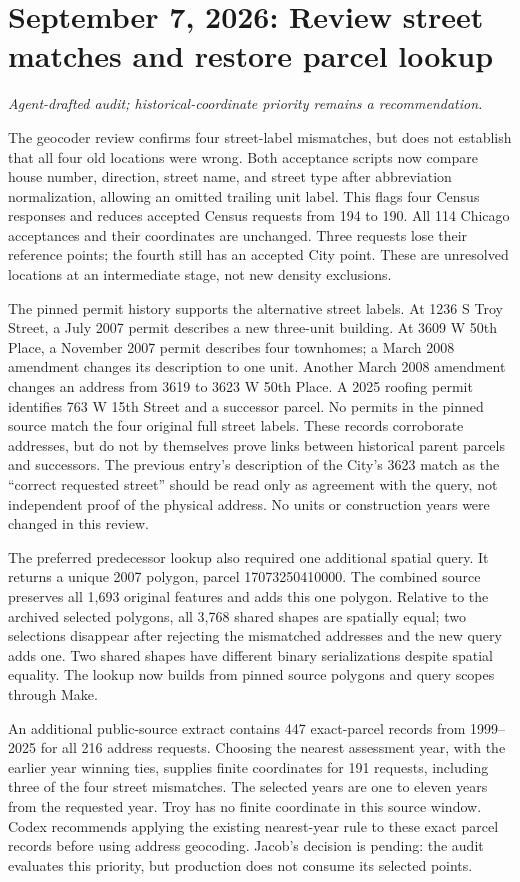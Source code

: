 \section*{September 7, 2026: Review street matches and restore parcel lookup}
\textit{Agent-drafted audit; historical-coordinate priority remains a recommendation.}

The geocoder review confirms four street-label mismatches, but does not establish
that all four old locations were wrong. Both acceptance scripts now compare house
number, direction, street name, and street type after abbreviation normalization,
allowing an omitted trailing unit label. This flags four Census responses and
reduces accepted Census requests from 194 to 190. All 114 Chicago acceptances and
their coordinates are unchanged. Three requests lose their reference points;
the fourth still has an accepted City point. These are unresolved locations at an
intermediate stage, not new density exclusions.

The pinned permit history supports the alternative street labels. At 1236 S Troy
Street, a July 2007 permit describes a new three-unit building. At 3609 W 50th
Place, a November 2007 permit describes four townhomes; a March 2008 amendment
changes its description to one unit. Another March 2008 amendment changes an
address from 3619 to 3623 W 50th Place. A 2025 roofing permit identifies 763 W 15th
Street and a successor parcel. No permits in the pinned source match the four
original full street labels. These records corroborate addresses, but do not by
themselves prove links between historical parent parcels and successors. The
previous entry's description of the City's 3623 match as the ``correct requested
street'' should be read only as agreement with the query, not independent proof
of the physical address. No units or construction years were changed in this review.

The preferred predecessor lookup also required one additional spatial query. It
returns a unique 2007 polygon, parcel 17073250410000. The combined source preserves
all 1,693 original features and adds this one polygon. Relative to the archived
selected polygons, all 3,768 shared shapes are spatially equal; two selections
disappear after rejecting the mismatched addresses and the new query adds one.
Two shared shapes have different binary serializations despite spatial equality.
The lookup now builds from pinned source polygons and query scopes through Make.

An additional public-source extract contains 447 exact-parcel records from
1999--2025 for all 216 address requests. Choosing the nearest assessment year,
with the earlier year winning ties, supplies finite coordinates for 191 requests,
including three of the four street mismatches. The selected years are one to
eleven years from the requested year. Troy has no finite coordinate in this source
window. Codex recommends applying the existing nearest-year rule to these exact
parcel records before using address geocoding. Jacob's decision is pending: the
audit evaluates this priority, but production does not consume its selected points.

